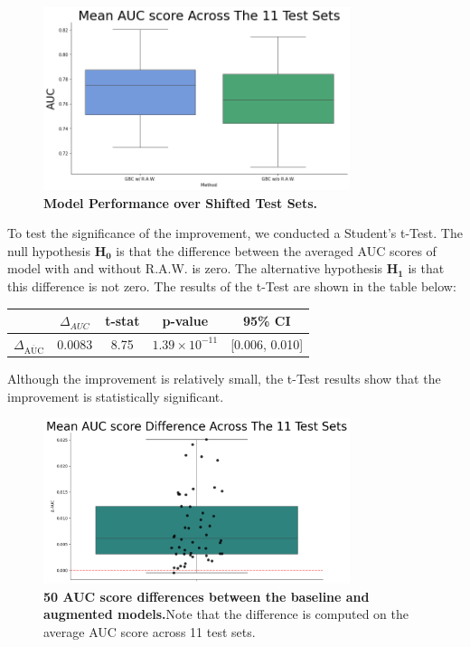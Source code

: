 \begin{figure}[H]
    \centering
    \includegraphics[width=0.8\textwidth]{assets/MeanAUCscoreacross10.png} 
    \caption{\textbf{Model Performance over Shifted Test Sets.}}
\end{figure}

To test the significance of the improvement, we conducted a Student's t-Test. The null hypothesis $\boldsymbol{H_0}$ is that the difference between the averaged AUC scores of model with and without R.A.W. is zero. The alternative hypothesis $\boldsymbol{H_1}$ is that this difference is not zero. The results of the t-Test are shown in the table below:

\begin{table}[H]
    \centering
    \begin{tabular}{lcccc}
        \toprule
        & $\Delta_{AUC}$ & t-stat & p-value & 95\% CI \\
        \midrule
        $\Delta_{\overline{\text{AUC}}}$ & 0.0083 & 8.75  & $1.39 \times 10^{-11}$ & [0.006, 0.010] \\
        \bottomrule
    \end{tabular}
\end{table}

Although the improvement is relatively small, the t-Test results show that the improvement is statistically significant.

\begin{figure}[H]
    \centering
    \includegraphics[width=0.8\textwidth]{assets/diffAUC10.png} 
    \caption{\textbf{50 AUC score differences between the baseline and augmented models.}Note that the difference is computed on the average AUC score across 11 test sets.}
\end{figure}


